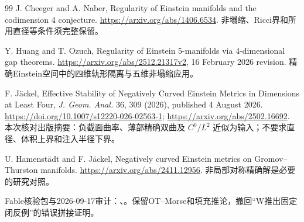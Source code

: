 \documentclass[UTF8,fontset=fandol,zihao=-4]{ctexart}
\theoremstyle{research}
\begin{document}
\begin{thebibliography}{99}
 J. Cheeger and A. Naber, Regularity of Einstein manifolds and the codimension 4 conjecture. \url{https://arxiv.org/abs/1406.6534}. 非塌缩、Ricci界和所用直径等条件须完整保留。

 Y. Huang and T. Ozuch, Regularity of Einstein 5-manifolds via 4-dimensional gap theorems. \url{https://arxiv.org/abs/2512.21317v2}, 16 February 2026 revision. 精确Einstein空间中的四维轨形隔离与五维非塌缩应用。

 F. Jäckel, Effective Stability of Negatively Curved Einstein Metrics in Dimensions at Least Four, \emph{J. Geom. Anal.} 36, 309 (2026), published 4 August 2026. \url{https://doi.org/10.1007/s12220-026-02563-1}; \url{https://arxiv.org/abs/2502.16692}. 本次核对出版摘要：负截面曲率、薄部精确双曲及 $C^0/L^2$ 近似为输入；不要求直径、体积上界和注入半径下界。

 U. Hamenstädt and F. Jäckel, Negatively curved Einstein metrics on Gromov--Thurston manifolds. \url{https://arxiv.org/abs/2411.12956}. 非局部对称精确解是必要的研究对照。

 Fable核验包与2026-09-17审计：、。保留OT--Morse和填充推论，撤回“W推出固定闭反例”的错误拼接证明。

\end{thebibliography}
\end{document}
